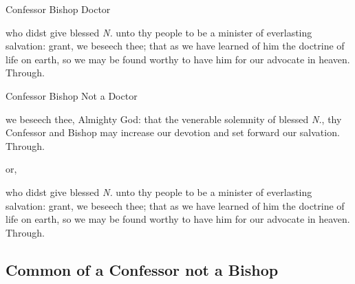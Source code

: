 \clearpage
\collect
\begin{inhead}\label{ConfessorBishopDoctorCollect}
	Confessor Bishop Doctor
\end{inhead}
 who didst give blessed \textit{N.} unto thy people to be a minister of everlasting salvation: grant, we beseech thee; that as we have learned of him the doctrine of life on earth, so we may be found worthy to have him for our advocate in heaven. Through.

\begin{inhead}\label{ConfessorBishopCollect}
	Confessor Bishop Not a Doctor
\end{inhead}
 we beseech thee, Almighty God: that the venerable solemnity of blessed \textit{N.}, thy Confessor and Bishop may increase our devotion and set forward our salvation. Through.
\begin{inhead}
	or,
\end{inhead}
 who didst give blessed \textit{N.} unto thy people to be a minister of everlasting salvation: grant, we beseech thee; that as we have learned of him the doctrine of life on earth, so we may be found worthy to have him for our advocate in heaven. Through.


\subsection{Common of a Confessor not a Bishop}\label{CommonConfessorNotBishop}

